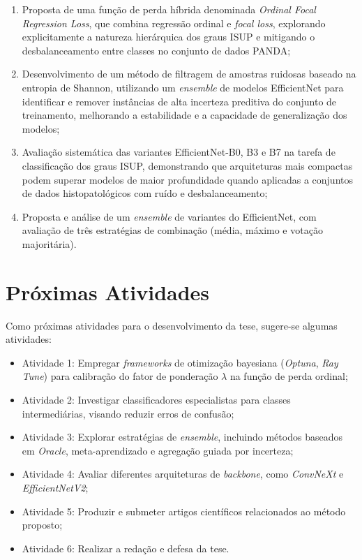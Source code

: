 \begin{enumerate}
	
	\item Proposta de uma função de perda híbrida denominada \textit{Ordinal Focal Regression Loss}, que combina regressão ordinal e \textit{focal loss}, explorando explicitamente a natureza hierárquica dos graus ISUP e mitigando o desbalanceamento entre classes no conjunto de dados PANDA;
	
	\item Desenvolvimento de um método de filtragem de amostras ruidosas baseado na entropia de Shannon, utilizando um \textit{ensemble} de modelos EfficientNet para identificar e remover instâncias de alta incerteza preditiva do conjunto de treinamento, melhorando a estabilidade e a capacidade de generalização dos modelos;
	
	\item Avaliação sistemática das variantes EfficientNet-B0, B3 e B7 na tarefa de classificação dos graus ISUP, demonstrando que arquiteturas mais compactas podem superar modelos de  maior profundidade quando aplicadas a conjuntos de dados histopatológicos com ruído e desbalanceamento;
	
	\item Proposta e análise de um \textit{ensemble} de variantes do EfficientNet, com avaliação de três estratégias de combinação (média, máximo e votação majoritária).
\end{enumerate}

\section{Próximas Atividades}
\label{sec:trabalhos-futuros}

Como próximas atividades para o desenvolvimento da tese, sugere-se algumas
atividades:

\begin{itemize}
	\item Atividade 1: Empregar \textit{frameworks} de otimização bayesiana (\textit{Optuna}, \textit{Ray Tune}) para calibração do fator de ponderação $\lambda$ na função de perda ordinal;
	\item Atividade 2: Investigar classificadores especialistas para classes intermediárias, visando reduzir erros de confusão;
	\item Atividade 3: Explorar estratégias de \textit{ensemble}, incluindo métodos baseados em \textit{Oracle}, meta-aprendizado e agregação guiada por incerteza;
	\item Atividade 4: Avaliar diferentes arquiteturas de \textit{backbone}, como \textit{ConvNeXt} e \textit{EfficientNetV2};
	\item Atividade 5: Produzir e submeter artigos científicos relacionados ao método proposto;
	\item Atividade 6: Realizar a redação e defesa da tese.	
\end{itemize}


